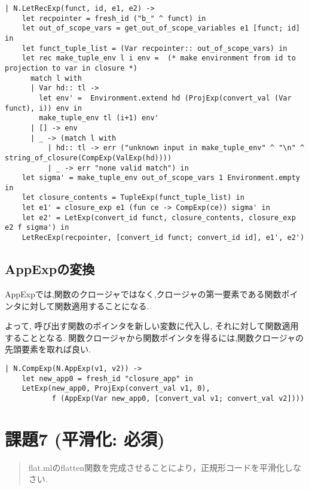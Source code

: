 \begin{lstlisting}[caption=LetRec式の実装]
| N.LetRecExp(funct, id, e1, e2) -> 
    let recpointer = fresh_id ("b_" ^ funct) in
    let out_of_scope_vars = get_out_of_scope_variables e1 [funct; id] in
    let funct_tuple_list = (Var recpointer:: out_of_scope_vars) in
    let rec make_tuple_env l i env =  (* make environment from id to projection to var in closure *)
      match l with 
      | Var hd:: tl ->
        let env' =  Environment.extend hd (ProjExp(convert_val (Var funct), i)) env in
        make_tuple_env tl (i+1) env'
      | [] -> env
      | _ -> (match l with 
          | hd:: tl -> err ("unknown input in make_tuple_env" ^ "\n" ^ string_of_closure(CompExp(ValExp(hd))))
          | _ -> err "none valid match") in
    let sigma' = make_tuple_env out_of_scope_vars 1 Environment.empty in
    let closure_contents = TupleExp(funct_tuple_list) in
    let e1' = closure_exp e1 (fun ce -> CompExp(ce)) sigma' in
    let e2' = LetExp(convert_id funct, closure_contents, closure_exp e2 f sigma') in
    LetRecExp(recpointer, [convert_id funct; convert_id id], e1', e2')
\end{lstlisting}

\subsection*{AppExpの変換}

AppExpでは,関数のクロージャではなく,クロージャの第一要素である関数ポインタに対して関数適用することになる. 

よって, 呼び出す関数のポインタを新しい変数に代入し, それに対して関数適用することとなる. 
関数クロージャから関数ポインタを得るには,関数クロージャの先頭要素を取れば良い.

\begin{lstlisting}[caption=AppExpの実装]
| N.CompExp(N.AppExp(v1, v2)) -> 
    let new_app0 = fresh_id "closure_app" in
    LetExp(new_app0, ProjExp(convert_val v1, 0), 
           f (AppExp(Var new_app0, [convert_val v1; convert_val v2])))
\end{lstlisting}

\section*{課題7 (平滑化: 必須)}

\begin{quotation}
flat.mlのflatten関数を完成させることにより，正規形コードを平滑化しなさい.
\end{quotation}

